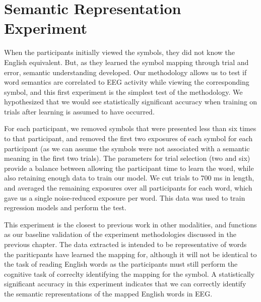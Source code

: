 \section{Semantic Representation Experiment}
\label{sec:experiments:semanticrepresentation}
When the participants initially viewed the symbols, they did not know the 
English equivalent. But, as they learned the symbol mapping through trial and 
error, semantic understanding developed. Our methodology allows us to test if 
word semantics are correlated to EEG activity while viewing the corresponding 
symbol, and this first experiment is the simplest test of the methodology. We 
hypothesized that we would see statistically significant accuracy when training 
on trials after learning is assumed to have occurred.

For each participant, we removed symbols that were presented less than six 
times to that participant, and removed the first two exposures of each symbol 
for each participant (as we can assume the symbols were not associated with a 
semantic meaning in the first two trials). The parameters for trial selection 
(two and six) provide a balance between allowing the participant time to learn 
the word, while also retaining enough data to train our model. We cut trials to 
700 ms in length, and averaged the remaining exposures over all participants 
for each word, which gave us a single noise-reduced exposure per word. This 
data was used to train regression models and perform the \tvt test. 

This experiment is the closest to previous work in other modalities, and 
functions as our baseline validation of the experiment methodologies discussed 
in the previous chapter. The data extracted is intended to be representative of 
words the pariticpants have learned the mapping for, although it will not be 
identical to the task of reading English words as the participants must still 
perform the cognitive task of correclty identifying the mapping for the symbol.  
A statistically significant \tvt accuracy in this experiment indicates that we 
can correctly identify the semantic representations of the mapped English words 
in EEG.
